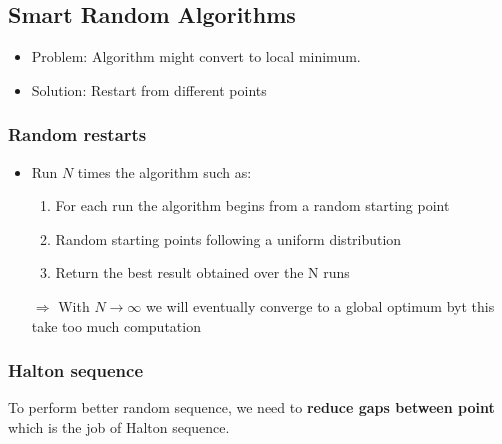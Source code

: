 \subsection{Smart Random Algorithms}
\begin{itemize}
    \item Problem: Algorithm might convert to local minimum.
    \item Solution:  Restart from different points
\end{itemize}

\subsubsection{Random restarts}
\begin{itemize}
    \item Run $N$ times the algorithm such as:
        \begin{enumerate}
            \item For each run the algorithm begins from a random starting
                point
            \item Random starting points following a uniform distribution
            \item Return the best result obtained over the N runs
        \end{enumerate}

    \item [$\Rightarrow $] With $N \rightarrow \infty $ we will
        eventually converge to a global optimum byt this take too much
        computation
\end{itemize}

\subsubsection{Halton sequence}

To perform better random sequence, we need to \textbf{reduce gaps
between point} which is the job of Halton sequence.

